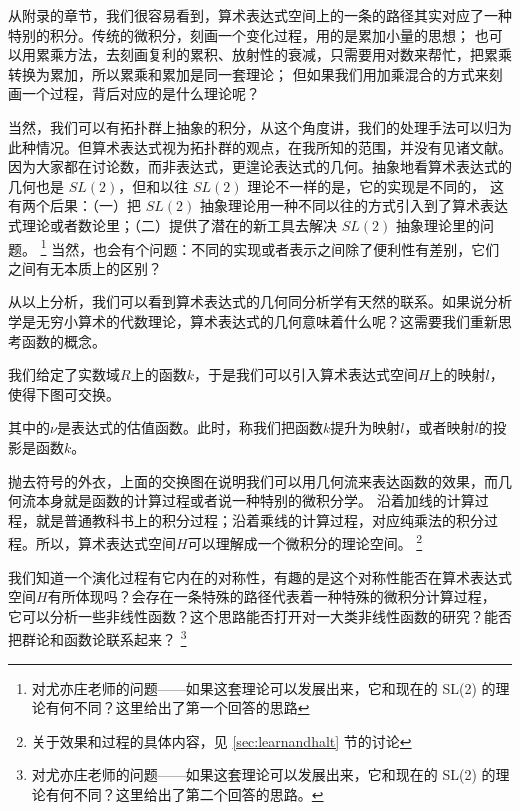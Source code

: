 \documentclass[a4paper,12pt]{article}
\numberwithin{problem}{section}
\numberwithin{definition}{section}
\numberwithin{lemma}{section}
\numberwithin{proposition}{section}
\numberwithin{theorem}{section}
\numberwithin{grammar}{section}
\numberwithin{program}{section}
\numberwithin{convention}{section}
\numberwithin{corollary}{section}
\begin{document}
从附录的章节，我们很容易看到，算术表达式空间上的一条的路径其实对应了一种特别的积分。传统的微积分，刻画一个变化过程，用的是累加小量的思想；
也可以用累乘方法，去刻画复利的累积、放射性的衰减，只需要用对数来帮忙，把累乘转换为累加，所以累乘和累加是同一套理论；
但如果我们用加乘混合的方式来刻画一个过程，背后对应的是什么理论呢？

当然，我们可以有拓扑群上抽象的积分，从这个角度讲，我们的处理手法可以归为此种情况。但算术表达式视为拓扑群的观点，在我所知的范围，并没有见诸文献。
因为大家都在讨论数，而非表达式，更遑论表达式的几何。抽象地看算术表达式的几何也是 $SL(2)$，但和以往 $SL(2)$ 理论不一样的是，它的实现是不同的，
这有两个后果：（一）把 $SL(2)$ 抽象理论用一种不同以往的方式引入到了算术表达式理论或者数论里；（二）提供了潜在的新工具去解决 $SL(2)$ 抽象理论里的问题。
\footnote{对尤亦庄老师的问题——如果这套理论可以发展出来，它和现在的 SL(2) 的理论有何不同？这里给出了第一个回答的思路}
当然，也会有个问题：不同的实现或者表示之间除了便利性有差别，它们之间有无本质上的区别？

从以上分析，我们可以看到算术表达式的几何同分析学有天然的联系。如果说分析学是无穷小算术的代数理论，算术表达式的几何意味着什么呢？这需要我们重新思考函数的概念。

我们给定了实数域$R$上的函数$k$，于是我们可以引入算术表达式空间$H$上的映射$l$，使得下图可交换。

\begin{center}
\end{center}

其中的$\nu$是表达式的估值函数。此时，称我们把函数$k$提升为映射$l$，或者映射$l$的投影是函数$k$。

抛去符号的外衣，上面的交换图在说明我们可以用几何流来表达函数的效果，而几何流本身就是函数的计算过程或者说一种特别的微积分学。
沿着加线的计算过程，就是普通教科书上的积分过程；沿着乘线的计算过程，对应纯乘法的积分过程。所以，算术表达式空间$H$可以理解成一个微积分的理论空间。
\footnote{关于效果和过程的具体内容，见 \ref{sec:learnandhalt} 节的讨论}

我们知道一个演化过程有它内在的对称性，有趣的是这个对称性能否在算术表达式空间$H$有所体现吗？会存在一条特殊的路径代表着一种特殊的微积分计算过程，
它可以分析一些非线性函数？这个思路能否打开对一大类非线性函数的研究？能否把群论和函数论联系起来？
\footnote{对尤亦庄老师的问题——如果这套理论可以发展出来，它和现在的 SL(2) 的理论有何不同？这里给出了第二个回答的思路。}
\end{document}
